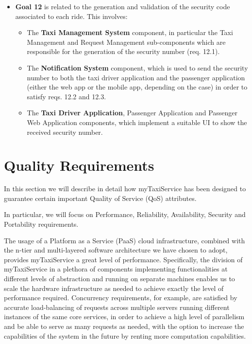\begin{itemize}
	\item \textbf{Goal 12} is related to the generation and validation of the security code associated to each ride. This involves:
	\begin{itemize}
	\item The \textbf{Taxi Management System} component, in particular the Taxi Management and Request Management sub-components which are responsible for the generation of the security number (req. 12.1).
	\item The \textbf{Notification System} component, which is used to send the security number to both the taxi driver application and the passenger application (either the web app or the mobile app, depending on the case) in order to satisfy reqs. 12.2 and 12.3.
	\item The \textbf{Taxi Driver Application}, {Passenger Application} and {Passenger Web Application} components, which implement a suitable UI to show the received security number.
	\end{itemize}
	\end{itemize}

\section{Quality Requirements}

In this section we will describe in detail how myTaxiService has been designed to guarantee certain important Quality of Service (QoS) attributes.

In particular, we will focus on Performance, Reliability, Availability, Security and Portability requirements.

The usage of a Platform as a Service (PaaS) cloud infrastructure, combined with the n-tier and multi-layered software architecture we have chosen to adopt, provides myTaxiService a great level of performance. Specifically, the division of myTaxiService in a plethora of components implementing functionalities at different levels of abstraction and running on separate machines enables us to scale the hardware infrastructure as needed to achieve exactly the level of performance required. Concurrency requirements, for example, are satisfied by accurate load-balancing of requests across multiple servers running different instances of the same core services, in order to achieve a high level of parallelism and be able to serve as many requests as needed, with the option to increase the capabilities of the system in the future by renting more computation capabilities. 

